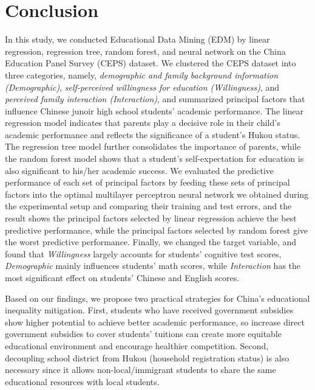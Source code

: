 \documentclass[conference]{IEEEtran}
\begin{document}
\section{Conclusion}
In this study, we conducted Educational Data Mining (EDM) by linear regression, regression tree, random forest, and neural network on the China Education Panel Survey (CEPS) dataset. We clustered the CEPS dataset into three categories, namely, \textit{demographic and family background information (Demographic)}, \textit{self-perceived willingness for education (Willingness)}, and \textit{perceived family interaction (Interaction)}, and summarized principal factors that influence Chinese junoir high school students' academic performance. The linear regression model indicates that parents play a decisive role in their child's academic performance and reflects the significance of a student's Hukou status. The regression tree model further consolidates the importance of parents, while the random forest model shows that a student's self-expectation for education is also significant to his/her academic success. We evaluated the predictive performance of each set of principal factors by feeding these sets of principal factors into the optimal multilayer perceptron neural network we obtained during the experimental setup and comparing their training and test errors, and the result shows the principal factors selected by linear regression achieve the best predictive performance, while the principal factors selected by random forest give the worst predictive performance. Finally, we changed the target variable, and found that \textit{Willingness} largely accounts for students' cognitive test scores,  \textit{Demographic} mainly influences students' math scores, while \textit{Interaction} has the most significant effect on students' Chinese and English scores.

Based on our findings, we propose two practical strategies for China's educational inequality mitigation. First, students who have received government subsidies show higher potential to achieve better academic performance, so increase direct government subsidies to cover students' tuitions can create more equitable educational environment and encourage healthier competition. Second, decoupling school district from Hukou (household registration status) is also necessary since it allows non-local/immigrant students to share the same educational resources with local students. 
\end{document}

